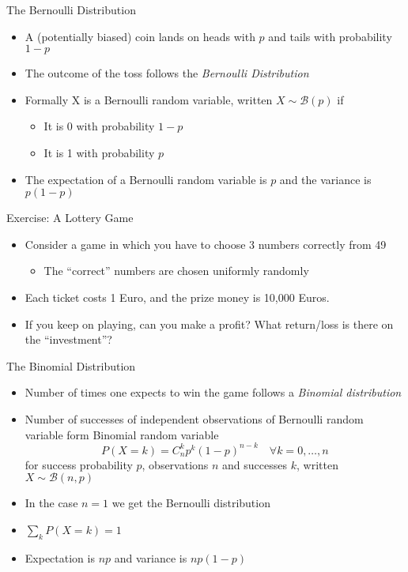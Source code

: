 \documentclass{beamer}
\begin{document}
\begin{frame}{The Bernoulli Distribution}
\begin{itemize}
 \item A (potentially biased) coin lands on heads with $p$ and tails with probability $1-p$
\item The outcome of the toss follows the \emph{Bernoulli Distribution} 
\item Formally X is a Bernoulli random variable, written $X \sim \mathcal{B}(p)$ if 
\begin{itemize}
\item It is 0 with probability $1-p$ 
\item It is 1 with probability $p$ 
\end{itemize} 
\item The expectation of a Bernoulli random variable is $p$ and the variance is $p(1-p)$
\end{itemize}
\end{frame}


\begin{frame}{Exercise: A Lottery Game}  
\begin{itemize} 
\item Consider a game in which you have to choose 3 numbers correctly from 49 
\begin{itemize}
\item The ``correct'' numbers are chosen uniformly randomly 
\end{itemize}
\item Each ticket costs 1 Euro, and the prize money is 10,000 Euros. 
\item If you keep on playing, can you make a profit? What return/loss is there on the ``investment''?
\end{itemize}
\end{frame}

\begin{frame}{The Binomial Distribution} 
\begin{itemize} 
 \item Number of times one expects to win the game follows a \emph{Binomial distribution}  
\item Number of successes of independent observations of Bernoulli random variable form Binomial random variable 
\begin{displaymath} 
 P(X = k) = C^k_n p^k (1-p)^{n-k} \quad \forall k = 0, \ldots, n
\end{displaymath}
for success probability $p$, observations $n$ and successes $k$, written $X \sim \mathcal{B}(n, p)$ 
\item In the case $n=1$ we get the Bernoulli distribution 
\item $\sum_k P(X = k) = 1$  
\item Expectation is $np$ and variance is $np(1-p)$
\end{itemize}
\end{frame}
\end{document}
